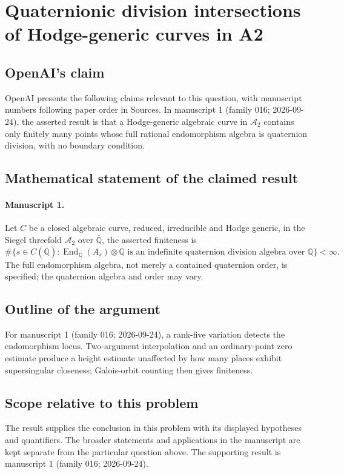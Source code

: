 \documentclass[11pt]{article}
\begin{document}
\section*{Quaternionic division intersections of Hodge-generic curves in A2}

\subsection{OpenAI's claim}
OpenAI presents the following claims relevant to this question, with manuscript numbers following paper order in Sources. In manuscript 1 (family 016; 2026-09-24), the asserted result is that a Hodge-generic algebraic curve in $\mathcal A_2$ contains only finitely many points whose full rational endomorphism algebra is quaternion division, with no boundary condition.

\subsection{Mathematical statement of the claimed result}
\paragraph{Manuscript 1.}
Let $C$ be a closed algebraic curve, reduced, irreducible and Hodge generic, in the Siegel threefold $\mathcal A_2$ over $\overline{\mathbb Q}$, the asserted finiteness is
\[
 \#\{s\in C(\overline{\mathbb Q}):
 \operatorname{End}_{\overline{\mathbb Q}}(A_s)\otimes\mathbb Q
 \text{ is an indefinite quaternion division algebra over }\mathbb Q\}<\infty.
\]
The full endomorphism algebra, not merely a contained quaternion order, is specified; the quaternion algebra and order may vary.

\subsection{Outline of the argument}
For manuscript 1 (family 016; 2026-09-24), a rank-five variation detects the endomorphism locus. Two-argument interpolation and an ordinary-point zero estimate produce a height estimate unaffected by how many places exhibit supersingular closeness; Galois-orbit counting then gives finiteness.

\subsection{Scope relative to this problem}
The result supplies the conclusion in this problem with its displayed hypotheses and quantifiers. The broader statements and applications in the manuscript are kept separate from the particular question above. The supporting result is manuscript 1 (family 016; 2026-09-24).
\end{document}

